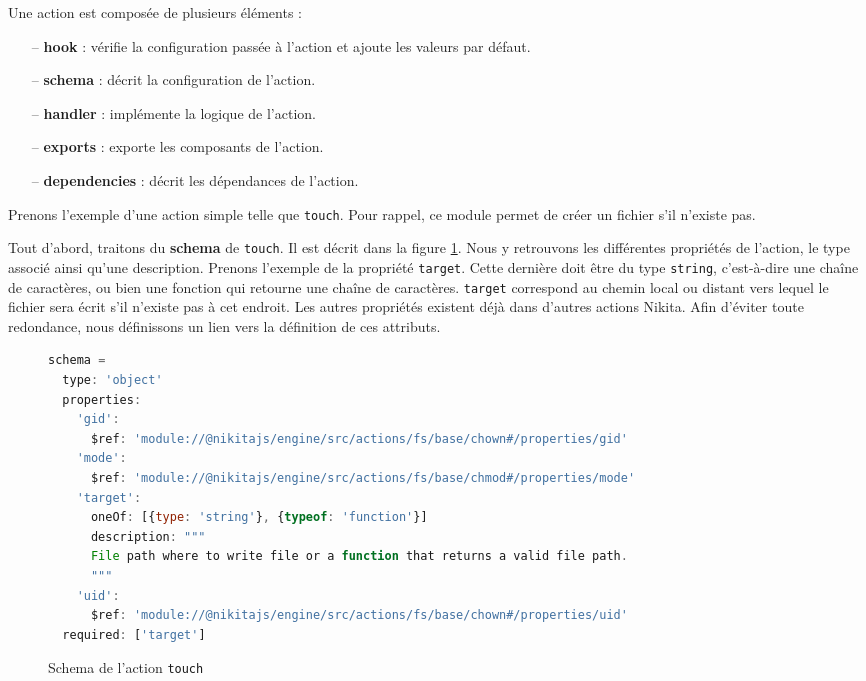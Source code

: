 \documentclass[12pt, french]{report}
\begin{document}
Une action est composée de plusieurs éléments :

\begin{itemize}
\item [--] \textbf{hook} : vérifie la configuration passée à l'action et ajoute les valeurs par défaut.
\item [--] \textbf{schema} : décrit la configuration de l'action.
\item [--] \textbf{handler} : implémente la logique de l'action.
\item [--] \textbf{exports} : exporte les composants de l'action.
\item [--] \textbf{dependencies} : décrit les dépendances de l'action.\\
\end{itemize}

Prenons l'exemple d'une action simple telle que \texttt{touch}. Pour rappel, ce module permet de créer un fichier s'il n'existe pas.

Tout d'abord, traitons du \textbf{schema} de \texttt{touch}. Il est décrit dans la figure \ref{code:touchSchema}. Nous y retrouvons les différentes propriétés de l'action, le type associé ainsi qu'une description. Prenons l'exemple de la propriété \texttt{target}. Cette dernière doit être du type \texttt{string}, c'est-à-dire une chaîne de caractères, ou bien une fonction qui retourne une chaîne de caractères. \texttt{target} correspond au chemin local ou distant vers lequel le fichier sera écrit s'il n'existe pas à cet endroit. Les autres propriétés existent déjà dans d'autres actions Nikita. Afin d'éviter toute redondance, nous définissons un lien vers la définition de ces attributs.

\begin{figure}[h]
\begin{lstlisting}[language=JavaScript]
schema =
  type: 'object'
  properties:
    'gid':
      $ref: 'module://@nikitajs/engine/src/actions/fs/base/chown#/properties/gid'
    'mode':
      $ref: 'module://@nikitajs/engine/src/actions/fs/base/chmod#/properties/mode'
    'target':
      oneOf: [{type: 'string'}, {typeof: 'function'}]
      description: """
      File path where to write file or a function that returns a valid file path.
      """
    'uid':
      $ref: 'module://@nikitajs/engine/src/actions/fs/base/chown#/properties/uid'
  required: ['target']
\end{lstlisting}
\centering
\caption{Schema de l'action \texttt{touch}}
\label{code:touchSchema}
\end{figure}
\end{document}
